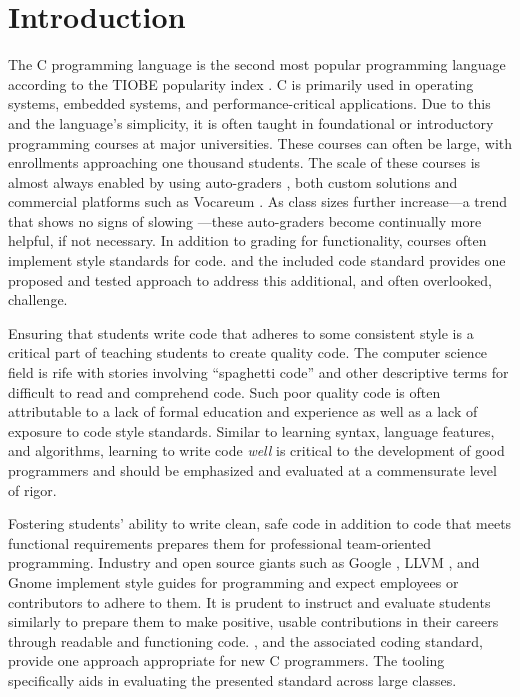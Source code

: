 \documentclass[sigconf]{acmart}
\begin{document}
\maketitle
\vfill\null
\columnbreak

\section{Introduction}
The C programming language is the second most popular programming language according to the
TIOBE popularity index \cite{tiobe}. C is
primarily used in operating systems, embedded systems, and performance-critical applications. Due to this and the language's simplicity, it is often taught in foundational or introductory programming courses at major universities. These courses can often be large, with enrollments approaching one thousand students.
The scale of these courses is almost always enabled by using auto-graders \cite{doi:10.1080/08993400500150747}, both custom solutions and commercial 
platforms such as Vocareum \cite{vocareum}. As class sizes further increase---a trend that shows no signs of slowing \cite{10.1145/2839509.2844616}---these auto-graders 
become continually more helpful, if not necessary. In addition to grading for functionality, courses often implement style standards for code. \tool{} and the included code standard provides one
proposed and tested approach to address this additional, and often overlooked, challenge.

Ensuring that students write code that adheres to some consistent style is a critical part of teaching students to create quality code. The computer science field is rife with stories involving ``spaghetti code'' and other descriptive terms for difficult to read and comprehend code. Such poor quality code is often attributable to a lack of formal education and experience as well as a lack of exposure to code style standards. Similar to learning syntax, language features, and algorithms, learning
to write code \textit{well} is
critical to the development of good programmers \cite{10.1145/3297156.3297227} and
should be emphasized and evaluated at a commensurate level of rigor.

Fostering students' ability to write clean, safe code in addition to code that
meets functional requirements prepares them for professional team-oriented programming.
Industry and open source giants such as Google \cite{GoogleCStyleGuide},
LLVM \cite{LLVMStyleGuide}, and Gnome \cite{GnomeStyleGuide} implement style guides for
programming and expect employees or contributors to adhere to them. It is prudent
to instruct and evaluate students similarly to prepare them to make positive,
usable contributions in their careers through readable and functioning code. \tool{}, and the associated
coding standard, provide one approach appropriate for new C programmers. The tooling specifically aids in evaluating the presented standard across large classes.
\end{document}
